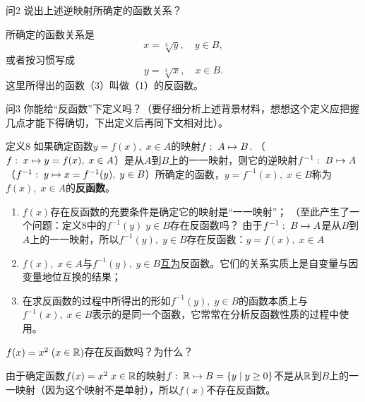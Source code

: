 \begin{thm}{问2} 
    说出上述逆映射所确定的函数关系？   
\end{thm}

\begin{solution}
所确定的函数关系是
\begin{equation}
    x=\sqrt[3]{y},\quad y\in B, \tag{2}    
\end{equation}
或者按习惯写成
\begin{equation}
    y=\sqrt[3]{x},\quad x\in B.    
\end{equation}
这里所得出的函数（3）叫做（1）的反函数。    
\end{solution}

\begin{thm}{问3} 
    你能给“反函数”下定义吗？（要仔细分析上述背景材料，想想这个定义应把握几点才能下得确切，下出定义后再同下文相对比）。  
\end{thm}

\begin{thm}{定义8}
    如果确定函数$y=f(x),\; x\in A$的映射$f:\; A\mapsto B$. （$f:\; x\mapsto y=f(x),\; x\in A$）是从$A$到$B$上的一一映射，则它的逆映射$f^{-1}:\; B\mapsto A$（$f^{-1}:\; y\mapsto x=f^{-1}(y),\; y\in B$）所确定的函数，$y=f^{-1}(x),\; x\in B$称为$f(x),\; x\in A$的\textbf{反函数}。
\end{thm}

\begin{note}
\begin{enumerate}
\item $f(x)$存在反函数的充要条件是确定它的映射是“一一映射”；
（至此产生了一个问题：定义8中的$f^{-1}(y)\; y\in B$存在反函数吗？
由于$f^{-1}:\; B\mapsto A$是从$B$到$A$上的一一映射，所以$f^{-1}(y),\; y\in B$存在反函数：$y=f(x),\; x\in A$
\item $f(x),\; x\in A$与$f^{-1}(y),\; y\in B$\underline{互为}反函数。它们的关系实质上是自变量与因变量地位互换的结果；
\item 在求反函数的过程中所得出的形如$f^{-1}(y),\; y\in B$的函数本质上与$f^{-1}(x),\; x\in B$表示的是同一个函数，它常常在分析反函数性质的过程中使用。
\end{enumerate}
\end{note}

\begin{example}
    $f(x)=x^2\; (x\in\mathbb{R})$存在反函数吗？为什么？
\end{example}

\begin{solution}
由于确定函数$f(x)=x^2\; x\in\mathbb{R}$的映射$f:\; \mathbb{R}\mapsto B=\{y\mid y\ge 0\}$不是从$\mathbb{R}$到$B$上的一一映射（因为这个映射不是单射），所以$f(x)$不存在反函数。    
\end{solution}

